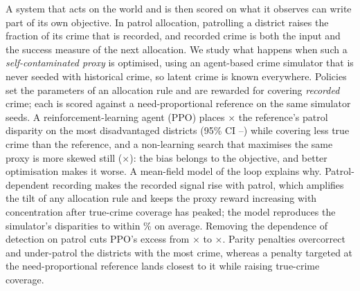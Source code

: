 A system that acts on the world and is then scored on what it observes can write
part of its own objective. In patrol allocation, patrolling a district raises
the fraction of its crime that is recorded, and recorded crime is both the input
and the success measure of the next allocation. We study what happens when such
a \emph{self-contaminated proxy} is optimised, using an agent-based crime
simulator that is never seeded with historical crime, so latent crime is known
everywhere. Policies set the parameters of an allocation rule and are rewarded
for covering \emph{recorded} crime; each is scored against a need-proportional
reference on the same simulator seeds. A reinforcement-learning agent (PPO)
places \nPPOx$\times$ the reference's patrol disparity on the most disadvantaged
districts (95\% CI \nPPOxLo--\nPPOxHi) while covering less true crime than the
reference, and a non-learning search that maximises the same proxy is more
skewed still (\nBRRx$\times$): the bias belongs to the objective, and better
optimisation makes it worse. A mean-field model of the loop explains why.
Patrol-dependent recording makes the recorded signal rise with patrol, which
amplifies the tilt of any allocation rule and keeps the proxy reward increasing
with concentration after true-crime coverage has peaked; the model reproduces
the simulator's disparities to within \nThDispErr\% on average. Removing the
dependence of detection on patrol cuts PPO's excess from \nEfiveBase$\times$ to
\nEfiveConst$\times$. Parity penalties overcorrect and under-patrol the
districts with the most crime, whereas a penalty targeted at the
need-proportional reference lands closest to it while raising true-crime
coverage.
